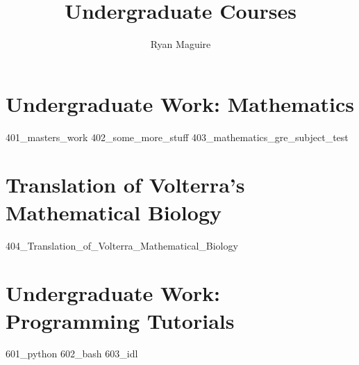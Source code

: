 \documentclass[crop=false,class=book,oneside]{standalone}
\title{Undergraduate Courses}
\author{Ryan Maguire}
\date{\vspace{-5ex}}
\begin{document}
\part{Undergraduate Work: Mathematics}
{401_masters_work}
{402_some_more_stuff}
{403_mathematics_gre_subject_test}
\part{Translation of Volterra's Mathematical Biology}
{404_Translation_of_Volterra_Mathematical_Biology}
\part{Undergraduate Work: Programming Tutorials}
{601_python}
{602_bash}
{603_idl}
\end{document}

